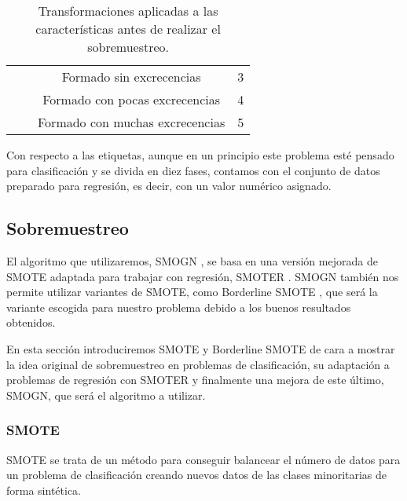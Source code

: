 \begin{table}[H]
{\begin{tabular}{|c|c|c|c|}
                                                      &                            & Formado sin excrecencias        & 3                                \\ \cline{3-4}
                                                      &                            & Formado con pocas excrecencias  & 4                                \\ \cline{3-4}
                                                      &                            & Formado con muchas excrecencias & 5                                \\ \hline
\end{tabular}%
}
\caption{Transformaciones aplicadas a las características antes de realizar el sobremuestreo.}\label{table:transformaciones_numericas}

\end{table}

Con respecto a las etiquetas, aunque en un principio este problema esté pensado para clasificación y se divida en diez fases, contamos con el conjunto de datos preparado para regresión, es decir, con un valor numérico asignado.


\subsection{Sobremuestreo}

El algoritmo que utilizaremos, SMOGN \cite{SMOGN}, se basa en una versión mejorada de SMOTE \cite{SMOTE} adaptada para trabajar con regresión, SMOTER \cite{SMOTER}. SMOGN también nos permite utilizar variantes de SMOTE, como Borderline SMOTE \cite{BL-SMOTE}, que será la variante escogida para nuestro problema debido a los buenos resultados obtenidos.

En esta sección introduciremos SMOTE y Borderline SMOTE de cara a mostrar la idea original de sobremuestreo en problemas de clasificación, su adaptación a problemas de regresión con SMOTER y finalmente una mejora de este último, SMOGN, que será el algoritmo a utilizar.

\subsubsection{SMOTE}

SMOTE se trata de un método para conseguir balancear el número de datos para un problema de clasificación creando nuevos datos de las clases minoritarias de forma sintética.

